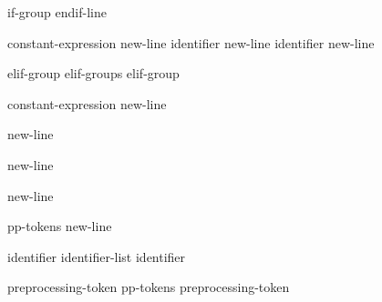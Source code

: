 \begin{bnf}
\br
    if-group   endif-line
\end{bnf}

\begin{bnf}\obeyspaces
{}\br
     constant-expression new-line \br
     identifier new-line \br
     identifier new-line 
\end{bnf}

\begin{bnf}
\br
    elif-group\br
    elif-groups elif-group
\end{bnf}

\begin{bnf}\obeyspaces
{}\br
     constant-expression new-line 
\end{bnf}

\begin{bnf}\obeyspaces
{}\br
     new-line 
\end{bnf}

\begin{bnf}\obeyspaces
{}\br
     new-line
\end{bnf}

\begin{bnf}
\br
     new-line
\end{bnf}

\begin{bnf}
\br
    pp-tokens new-line
\end{bnf}

\begin{bnf}
\br
\end{bnf}

\begin{bnf}
\br
    identifier\br
    identifier-list \terminal{,} identifier
\end{bnf}

\begin{bnf}
\br
\end{bnf}

\begin{bnf}
\br
    preprocessing-token\br
    pp-tokens preprocessing-token
\end{bnf}

